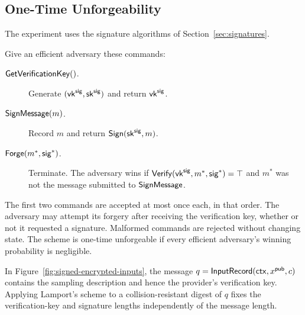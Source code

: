 \subsection{One-Time Unforgeability}
\label{app:signatures}

The experiment uses the signature algorithms of Section~\ref{sec:signatures}.
\begin{definition}
\label{def:one-time-signatures}
Give an efficient adversary these commands:
\begin{description}
  \item[$\mathsf{GetVerificationKey}()$.]
    Generate $(\mathsf{vk}^{\mathsf{sig}},\mathsf{sk}^{\mathsf{sig}})$ and return $\mathsf{vk}^{\mathsf{sig}}$.
  \item[$\mathsf{SignMessage}(m)$.]
    Record $m$ and return $\mathsf{Sign}(\mathsf{sk}^{\mathsf{sig}},m)$.
  \item[$\mathsf{Forge}(m^*,\mathsf{sig}^*)$.]
    Terminate.  The adversary wins if
    $\mathsf{Verify}(\mathsf{vk}^{\mathsf{sig}},m^*,\mathsf{sig}^*)=\top$ and $m^*$ was not the
    message submitted to $\mathsf{SignMessage}$.
\end{description}
The first two commands are accepted at most once each, in that order.
The adversary may attempt its forgery after receiving the verification
key, whether or not it requested a signature.  Malformed commands are
rejected without changing state.  The scheme is one-time unforgeable
if every efficient adversary's winning probability is negligible.
\end{definition}

In Figure~\ref{fig:signed-encrypted-inputs}, the message
$q=\mathsf{InputRecord}(\mathsf{ctx},x^{\mathsf{pub}},c)$ contains the sampling description and
hence the provider's verification key. Applying Lamport's scheme to a
collision-resistant digest of $q$ fixes the verification-key and signature
lengths independently of the message length.
